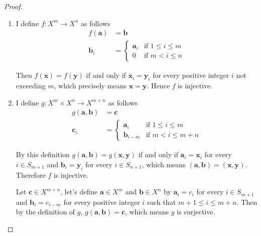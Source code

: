 \begin{proof}
    \begin{enumerate}[label={(\alph*)}]
        \item I define $f: X^{m}\to X^{n}$ as follows
              \begin{align*}
                  f(\mathbf{a})  & = \mathbf{b}                                 \\
                  \mathbf{b}_{i} & = \begin{cases}
                                         \mathbf{a}_{i} & \text{if $1\leq i\leq m$} \\
                                         0              & \text{if $m < i\leq n$}
                                     \end{cases}
              \end{align*}

              Then $f(\mathbf{x}) = f(\mathbf{y})$ if and only if $\mathbf{x}_{i} = \mathbf{y}_{i}$ for every positive integer $i$ not exceeding $m$, which precisely means $\mathbf{x} = \mathbf{y}$. Hence $f$ is injective.
        \item I define $g: X^{m}\times X^{n}\to X^{m+n}$ as follows
              \begin{align*}
                  g(\mathbf{a}, \mathbf{b}) & = \mathbf{c}                                   \\
                  \mathbf{c}_{i}            & = \begin{cases}
                                                    \mathbf{a}_{i}   & \text{if $1\leq i\leq m$} \\
                                                    \mathbf{b}_{i-m} & \text{if $m < i\leq m+n$}
                                                \end{cases}
              \end{align*}

              By this definition $g(\mathbf{a}, \mathbf{b}) = g(\mathbf{x}, \mathbf{y})$ if and only if $\mathbf{a}_{i} = \mathbf{x}_{i}$ for every $i\in S_{m+1}$ and $\mathbf{b}_{i} = \mathbf{y}_{i}$ for every $i\in S_{n+1}$, which means $(\mathbf{a}, \mathbf{b}) = (\mathbf{x}, \mathbf{y})$. Therefore $f$ is injective.

              Let $\mathbf{c}\in X^{m+n}$, let's define $\mathbf{a}\in X^{m}$ and $\mathbf{b}\in X^{n}$ by $\mathbf{a}_{i} = c_{i}$ for every $i\in S_{m+1}$ and $\mathbf{b}_{i} = c_{i-m}$ for every positive integer $i$ such that $m+1\leq i\leq m+n$. Then by the definition of $g$, $g(\mathbf{a}, \mathbf{b}) = \mathbf{c}$, which means $g$ is surjective.


\end{enumerate}
\end{proof}
